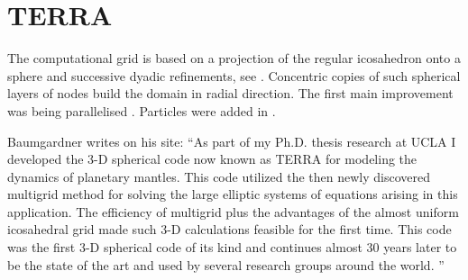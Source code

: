 \section{TERRA} 
The computational grid is based on a projection of the regular icosahedron onto a 
sphere and successive dyadic refinements, see \textcite{bafr85}.  Concentric copies of such  
spherical layers of nodes build the domain in radial direction.
The first main improvement was being parallelised \textcite{buba95}.
Particles were added in \textcite{strb02}.

Baumgardner writes on his site:
``As part of my Ph.D. thesis research at UCLA I developed the 3-D spherical code now 
known as TERRA for modeling the dynamics of planetary mantles.  This code utilized 
the then newly discovered multigrid method for solving the large elliptic systems 
of equations arising in this application.  The efficiency of multigrid plus the advantages 
of the almost uniform icosahedral grid made such 3-D calculations feasible for the 
first time.  This code was the first 3-D spherical code of its kind and continues 
almost 30 years later to be the state of the art and used by several research groups around the world. ''

